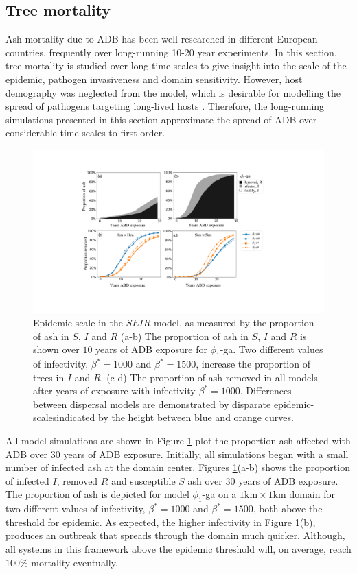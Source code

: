 \subsection{Tree mortality}
\label{sec:tree-mortality}

Ash mortality due to ADB has been well-researched in different European countries, frequently over long-running 10-20 year experiments.
In this section, tree mortality is studied over long time scales to give insight into the scale of the epidemic, pathogen invasiveness and domain sensitivity.
However, host demography was neglected from the model, which is desirable for modelling the spread of pathogens targeting long-lived hosts \cite{doi:10.1098/rstb.1996.0059}.
Therefore, the long-running simulations presented in this section approximate the spread of ADB over considerable time scales to first-order.

\begin{figure}
    \centering
    \includegraphics[scale=0.42]{chapter6/figures/fig6-mortality.pdf}
    \caption{Epidemic-scale in the $SEIR$ model, as measured by the proportion of ash in $S$, $I$ and $R$ (a-b) The proportion of ash in $S$, $I$ and $R$ is shown over $10$ years of ADB exposure for $\phi_1$-ga. Two different values of infectivity, $\beta^*=1000$ and $\beta^*=1500$, increase the proportion of trees in $I$ and $R$. (c-d) The proportion of ash removed in all models after years of exposure with infectivity $\beta^*=1000$. Differences between dispersal models are demonstrated by disparate epidemic-scales\textemdash indicated by the height between blue and orange curves.}
    \label{fig:ash-mortalty}
\end{figure}

All model simulations are shown in Figure \ref{fig:ash-mortalty} plot the proportion ash affected with ADB over $30$ years of ADB exposure.
Initially, all simulations began with a small number of infected ash at the domain center.
Figures \ref{fig:ash-mortalty}(a-b) shows the proportion of infected $I$, removed $R$ and susceptible $S$ ash over $30$ years of ADB exposure.
The proportion of ash is depicted for model $\phi_1$-ga on a $1\mathrm{km}\times 1 \mathrm{km}$ domain for two different values of infectivity, $\beta^*=1000$ and $\beta^*=1500$, both above the threshold for epidemic.
As expected, the higher infectivity in Figure \ref{fig:ash-mortalty}(b), produces an outbreak that spreads through the domain much quicker.
Although, all systems in this framework above the epidemic threshold will, on average, reach $100\%$ mortality eventually.

